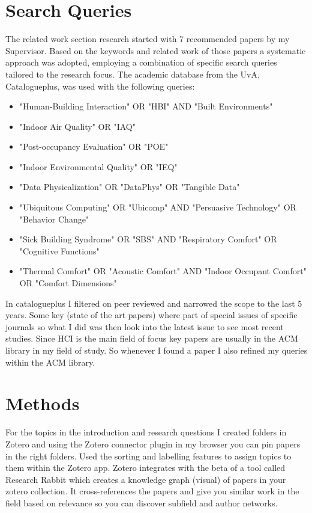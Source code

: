 \section{Search Queries}

The related work section research started with 7 recommended papers by my Supervisor. Based on the keywords and related work of those papers a systematic approach was adopted, employing a combination of specific search queries tailored to the research focus. The academic database from the UvA, Catalogueplus, was used with the following queries:

\begin{itemize}
    \item "Human-Building Interaction" OR "HBI" AND "Built Environments"
    \item "Indoor Air Quality" OR "IAQ"
    \item "Post-occupancy Evaluation" OR "POE"
    \item "Indoor Environmental Quality" OR "IEQ"
    \item "Data Physicalization" OR "DataPhys" OR "Tangible Data"
    \item "Ubiquitous Computing" OR "Ubicomp" AND "Persuasive Technology" OR "Behavior Change"
    \item "Sick Building Syndrome" OR "SBS" AND "Respiratory Comfort" OR "Cognitive Functions"
    \item "Thermal Comfort" OR "Acoustic Comfort" AND "Indoor Occupant Comfort" OR "Comfort Dimensions"
\end{itemize}

In catalogueplus I filtered on peer reviewed and narrowed the scope to the last 5 years. Some key (state of the art papers) where part of special issues of specific journals so what I did was then look into the latest issue to see most recent studies. Since HCI is the main field of focus key papers are usually in the ACM library in my field of study. So whenever I found a paper I also refined my queries within the ACM library.

\section{Methods}

For the topics in the introduction and research questions I created folders in Zotero and using the Zotero connector plugin in my browser you can pin papers in the right folders. Used the sorting and labelling features to assign topics to them within the Zotero app. Zotero integrates with the beta of a tool called Research Rabbit which creates a knowledge graph (visual) of papers in your zotero collection. It cross-references the papers and give you similar work in the field based on relevance so you can discover subfield and author networks.
